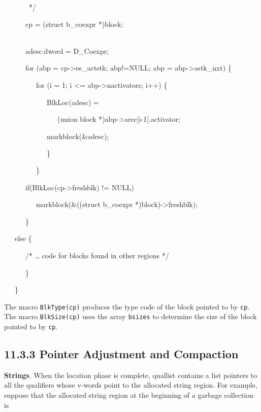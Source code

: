 {\ttfamily\mdseries
\ \ \ \ \ \ \ */
}

{\ttfamily\mdseries
\ \ \ \ \ \ cp = (struct b\_coexpr *)block;
\ \ \ \ \ \ \ \ \ \ \ \ \ \ \ \ \ \ \ \ \ \ \ \ \ \ \ \ \ \ \ \ \ \ \ \ \ \ \ \ \ \ \ }

{\ttfamily\mdseries
\ \ \ \ \ \ adesc.dword = D\_Coexpr;
}

{\ttfamily\mdseries
\ \ \ \ \ \ for (abp = cp-{\textgreater}es\_actstk; abp!=NULL; abp = abp-{\textgreater}astk\_nxt) \{
}

{\ttfamily\mdseries
\ \ \ \ \ \ \ \ \ for (i = 1; i {\textless}= abp-{\textgreater}nactivators; i++) \{
}

{\ttfamily\mdseries
\ \ \ \ \ \ \ \ \ \ \ \ BlkLoc(adesc) =}

{\ttfamily\mdseries
\ \ \ \ \ \ \ \ \ \ \ \ \ \ \ (union block *)abp-{\textgreater}arec[i-1].activator;}

{\ttfamily\mdseries
\ \ \ \ \ \ \ \ \ \ \ \ markblock(\&adesc);
}

{\ttfamily\mdseries
\ \ \ \ \ \ \ \ \ \ \ \ \}
}

{\ttfamily\mdseries
\ \ \ \ \ \ \ \ \ \}
}

{\ttfamily\mdseries
\ \ \ \ \ \ if(BlkLoc(cp-{\textgreater}freshblk) != NULL)
}

{\ttfamily\mdseries
\ \ \ \ \ \ \ \ \ markblock(\&((struct b\_coexpr *)block)-{\textgreater}freshblk);
}

{\ttfamily\mdseries
\ \ \ \ \ \ \}}

{\ttfamily\mdseries
\ \ \ else \{}

{\ttfamily\mdseries
\ \ \ \ \ \ /* {\dots} code for blocks found in other regions */}

{\ttfamily\mdseries
\ \ \ \ \ \ \}}

{\ttfamily\mdseries
\ \ \ \}}


The macro \texttt{BlkType(cp)} produces the type code of the block
pointed to by \texttt{cp}. The macro \texttt{BlkSize(cp)} uses the
array \texttt{bsizes} to determine the size of the block pointed to by
\texttt{cp}.

\subsection[11.3.3 Pointer Adjustment and Compaction]{11.3.3 Pointer Adjustment and Compaction}

\textbf{Strings}. When the location phase is complete, quallist
contains a list pointers to all the qualifiers whose v-words point to
the allocated string region. For example, suppose that the allocated
string region at the beginning of a garbage collection is

